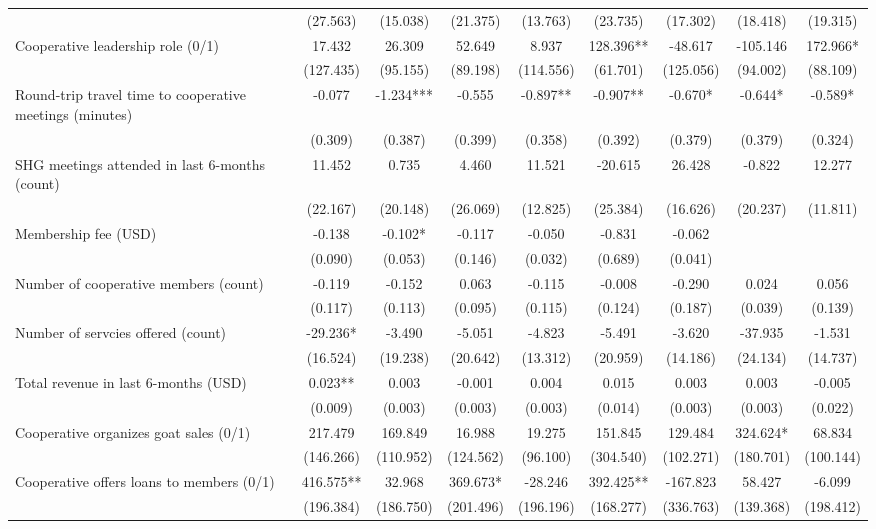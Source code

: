 \documentclass[11pt]{article}
\begin{document}
\begin{landscape}
\begin{table}[H]
{\begin{tabularx}{1.8\linewidth}{lcccccccc}
 & (27.563) & (15.038) & (21.375) & (13.763) & (23.735) & (17.302) & (18.418) & (19.315) \\
Cooperative leadership role (0/1) & 17.432 & 26.309 & 52.649 & 8.937 & 128.396** & -48.617 & -105.146 & 172.966* \\
 & (127.435) & (95.155) & (89.198) & (114.556) & (61.701) & (125.056) & (94.002) & (88.109) \\
Round-trip travel time to cooperative meetings (minutes) & -0.077 & -1.234*** & -0.555 & -0.897** & -0.907** & -0.670* & -0.644* & -0.589* \\
 & (0.309) & (0.387) & (0.399) & (0.358) & (0.392) & (0.379) & (0.379) & (0.324) \\
SHG meetings attended in last 6-months (count) & 11.452 & 0.735 & 4.460 & 11.521 & -20.615 & 26.428 & -0.822 & 12.277 \\
 & (22.167) & (20.148) & (26.069) & (12.825) & (25.384) & (16.626) & (20.237) & (11.811) \\
Membership fee (USD) & -0.138 & -0.102* & -0.117 & -0.050 & -0.831 & -0.062 &  &  \\
 & (0.090) & (0.053) & (0.146) & (0.032) & (0.689) & (0.041) &  &  \\
Number of cooperative members (count) & -0.119 & -0.152 & 0.063 & -0.115 & -0.008 & -0.290 & 0.024 & 0.056 \\
 & (0.117) & (0.113) & (0.095) & (0.115) & (0.124) & (0.187) & (0.039) & (0.139) \\
Number of servcies offered (count) & -29.236* & -3.490 & -5.051 & -4.823 & -5.491 & -3.620 & -37.935 & -1.531 \\
 & (16.524) & (19.238) & (20.642) & (13.312) & (20.959) & (14.186) & (24.134) & (14.737) \\
Total revenue in last 6-months (USD) & 0.023** & 0.003 & -0.001 & 0.004 & 0.015 & 0.003 & 0.003 & -0.005 \\
 & (0.009) & (0.003) & (0.003) & (0.003) & (0.014) & (0.003) & (0.003) & (0.022) \\
Cooperative organizes goat sales (0/1) & 217.479 & 169.849 & 16.988 & 19.275 & 151.845 & 129.484 & 324.624* & 68.834 \\
 & (146.266) & (110.952) & (124.562) & (96.100) & (304.540) & (102.271) & (180.701) & (100.144) \\
Cooperative offers loans to members (0/1) & 416.575** & 32.968 & 369.673* & -28.246 & 392.425** & -167.823 & 58.427 & -6.099 \\
 & (196.384) & (186.750) & (201.496) & (196.196) & (168.277) & (336.763) & (139.368) & (198.412) \\

\end{tabularx}}
\end{table}
\end{landscape}
\end{document}
